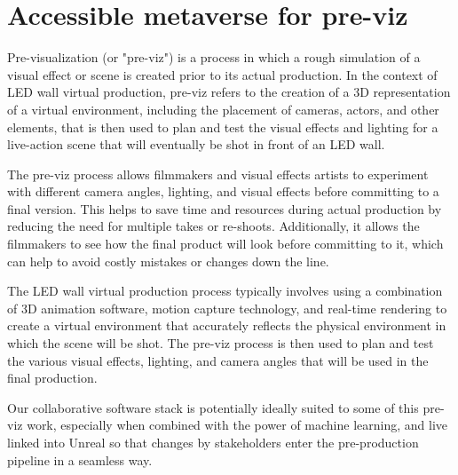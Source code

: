 

\section{Accessible metaverse for pre-viz}
Pre-visualization (or "pre-viz") is a process in which a rough simulation of a visual effect or scene is created prior to its actual production. In the context of LED wall virtual production, pre-viz refers to the creation of a 3D representation of a virtual environment, including the placement of cameras, actors, and other elements, that is then used to plan and test the visual effects and lighting for a live-action scene that will eventually be shot in front of an LED wall.\par
The pre-viz process allows filmmakers and visual effects artists to experiment with different camera angles, lighting, and visual effects before committing to a final version. This helps to save time and resources during actual production by reducing the need for multiple takes or re-shoots. Additionally, it allows the filmmakers to see how the final product will look before committing to it, which can help to avoid costly mistakes or changes down the line.\par
The LED wall virtual production process typically involves using a combination of 3D animation software, motion capture technology, and real-time rendering to create a virtual environment that accurately reflects the physical environment in which the scene will be shot. The pre-viz process is then used to plan and test the various visual effects, lighting, and camera angles that will be used in the final production.\par 
Our collaborative software stack is potentially ideally suited to some of this pre-viz work, especially when combined with the power of machine learning, and live linked into Unreal so that changes by stakeholders enter the pre-production pipeline in a seamless way.
